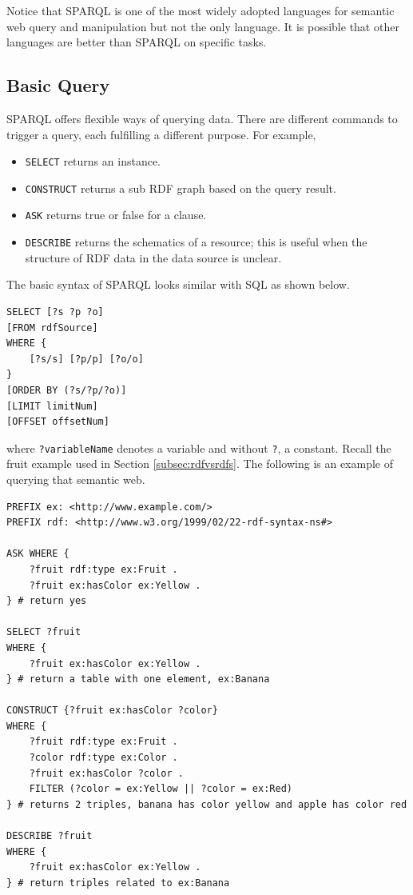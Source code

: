 Notice that SPARQL is one of the most widely adopted languages for semantic web query and manipulation but not the only language. It is possible that other languages are better than SPARQL on specific tasks.

\subsection{Basic Query}

SPARQL offers flexible ways of querying data. There are different commands to trigger a query, each fulfilling a different purpose. For example,
\begin{itemize}
	\item \verb|SELECT| returns an instance.
	\item \verb|CONSTRUCT| returns a sub RDF graph based on the query result.
	\item \verb|ASK| returns true or false for a clause.
	\item \verb|DESCRIBE| returns the schematics of a resource; this is useful when the structure of RDF data in the data source is unclear.
\end{itemize}

The basic syntax of SPARQL looks similar with SQL as shown below.
\begin{lstlisting}
SELECT [?s ?p ?o]
[FROM rdfSource]
WHERE {
	[?s/s] [?p/p] [?o/o]
}
[ORDER BY (?s/?p/?o)]
[LIMIT limitNum]
[OFFSET offsetNum]
\end{lstlisting}
where \verb|?variableName| denotes a variable and without \verb|?|, a constant. Recall the fruit example used in Section \ref{subsec:rdfvsrdfs}. The following is an example of querying that semantic web.
\begin{lstlisting}
PREFIX ex: <http://www.example.com/>
PREFIX rdf: <http://www.w3.org/1999/02/22-rdf-syntax-ns#>

ASK WHERE {
	?fruit rdf:type ex:Fruit .
	?fruit ex:hasColor ex:Yellow .
} # return yes

SELECT ?fruit
WHERE {
	?fruit ex:hasColor ex:Yellow .
} # return a table with one element, ex:Banana

CONSTRUCT {?fruit ex:hasColor ?color}
WHERE {
	?fruit rdf:type ex:Fruit .
	?color rdf:type ex:Color .
	?fruit ex:hasColor ?color .
	FILTER (?color = ex:Yellow || ?color = ex:Red)
} # returns 2 triples, banana has color yellow and apple has color red

DESCRIBE ?fruit
WHERE {
	?fruit ex:hasColor ex:Yellow .
} # return triples related to ex:Banana
\end{lstlisting}

